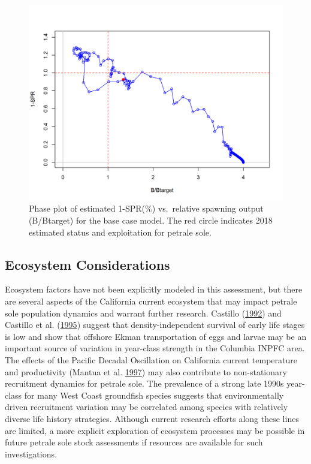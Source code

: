 \documentclass[12pt,]{article}
\begin{document}
\begin{figure}
\centering
\includegraphics{r4ss/plots_mod1/SPR4_phase.png}
\caption{Phase plot of estimated 1-SPR(\%) vs.~relative spawning output
(B/Btarget) for the base case model. The red circle indicates 2018
estimated status and exploitation for petrale sole.
\label{fig:Phase_all}}
\end{figure}

\FloatBarrier

\subsection*{Ecosystem Considerations}\label{ecosystem-considerations}

Ecosystem factors have not been explicitly modeled in this assessment,
but there are several aspects of the California current ecosystem that
may impact petrale sole population dynamics and warrant further
research. Castillo
(\protect\hyperlink{ref-castillo_g.c._fluctuations_1992}{1992}) and
Castillo et al.
(\protect\hyperlink{ref-castillo_latitudinal_1995}{1995}) suggest that
density-independent survival of early life stages is low and show that
offshore Ekman transportation of eggs and larvae may be an important
source of variation in year-class strength in the Columbia INPFC area.
The effects of the Pacific Decadal Oscillation on California current
temperature and productivity (Mantua et al.
\protect\hyperlink{ref-mantua_pacific_1997}{1997}) may also contribute
to non-stationary recruitment dynamics for petrale sole. The prevalence
of a strong late 1990s year-class for many West Coast groundfish species
suggests that environmentally driven recruitment variation may be
correlated among species with relatively diverse life history
strategies. Although current research efforts along these lines are
limited, a more explicit exploration of ecosystem processes may be
possible in future petrale sole stock assessments if resources are
available for such investigations.
\end{document}
